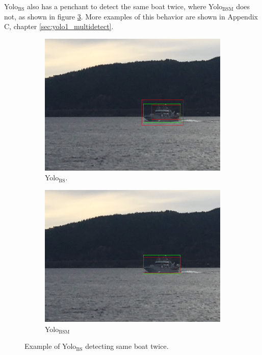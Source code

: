 \newpage

\noindent
Yolo$_{\text{BS}}$ also has a penchant to detect the same boat twice, where Yolo$_{\text{BSM}}$ does not, as shown in figure \ref{fig:yolo12_multibox}. More examples of this behavior are shown in Appendix C, chapter \ref{sec:yolo1_multidetect}.

\begin{figure}[h!]
\begin{subfigure}{.5\textwidth}
  \centering
  \includegraphics[width=0.8\linewidth]{results/case_tr_moor/yolo12/yolo1/2better/IMG_2269.jpg}
  \caption{Yolo$_{\text{BS}}$.}
  \label{fig:yolo1_multibox}
\end{subfigure}%
\begin{subfigure}{.5\textwidth}
  \centering
  \includegraphics[width=.8\linewidth]{results/case_tr_moor/yolo12/yolo2/2better/IMG_2269.jpg}
  \caption{Yolo$_{\text{BSM}}$}
  \label{fig:yolo2_multibox}
\end{subfigure}
\caption{Example of Yolo$_{\text{BS}}$ detecting same boat twice.}
\label{fig:yolo12_multibox}
\end{figure}

